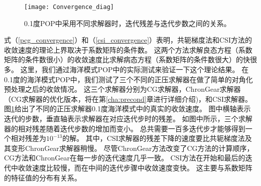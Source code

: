 \begin {figure}
\vspace{10pt}
\centering
\texttt{[image: Convergence\_diag]}
\caption[] {0.1度POP中采用不同求解器时，迭代残差与迭代步数之间的关系。\label{fig:convergence_diag}}
\end{figure}
式（\ref{pcg_convergence}）和（\ref{csi_convergence}）表明，共轭梯度法和CSI方法的收敛速度的理论上界取决于系数矩阵的条件数。 
这两个方法求解良态方程（系数矩阵的条件数很小）的收敛速度比求解病态方程（系数矩阵的条件数很大）的快很多。
这里，我们通过海洋模式POP中的实际测试来验证一下这个理论结果。 
在0.1度的海洋模式POP中，我们测试了三个不同的正压求解器在做了简单的对角化预处理之后的收敛情况。
这三个求解器分别为CG求解器，ChronGear求解器（CG求解器的优化版本，将在第\ref{cha:precond}章进行详细介绍)，和CSI求解器。
图\ref{fig:convergence_diag}给出了不同的正压求解器0.1度海洋模式中的真实的收敛速度。
图中横轴表示迭代的步数，垂直轴表示求解器在对应迭代步时的残差。 
如图中所示，三个求解器的相对残差随着迭代步数的增加而变小。
总共需要一百多迭代步才能够得到一个相对残差为$10^{-13}$的解。
其中，CSI求解器的残差下降的速度要比共轭梯度法及其变形ChronGear求解器稍慢。
尽管ChronGear方法改变了CG方法的计算顺序，CG方法和ChronGear在每一步的迭代速度几乎一致。
CSI方法在开始和最后的迭代中收敛速度比较慢，而在中间的迭代步骤中收敛速度变快。
这主要与系数矩阵的特征值的分布有关系。 


